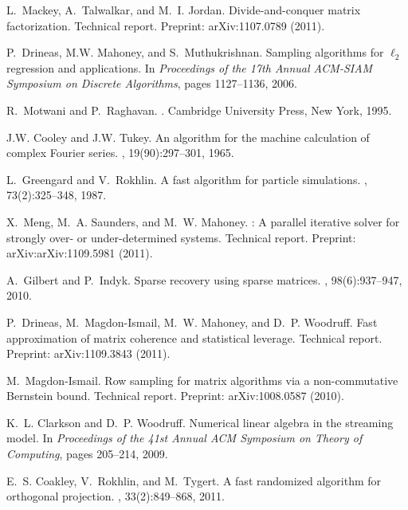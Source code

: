 \documentclass[twoside]{article}
\begin{document}
\begin{small}
\begin{thebibliography}{100}
L.~Mackey, A.~Talwalkar, and M.~I. Jordan.
\newblock Divide-and-conquer matrix factorization.
\newblock Technical report.
\newblock Preprint: arXiv:1107.0789 (2011).

P.~Drineas, M.W. Mahoney, and S.~Muthukrishnan.
\newblock Sampling algorithms for $\ell_2$ regression and applications.
\newblock In {\em Proceedings of the 17th Annual ACM-SIAM Symposium on Discrete
  Algorithms}, pages 1127--1136, 2006.

R.~Motwani and P.~Raghavan.
.
\newblock Cambridge University Press, New York, 1995.

J.W. Cooley and J.W. Tukey.
\newblock An algorithm for the machine calculation of complex {F}ourier series.
, 19(90):297--301, 1965.

L.~Greengard and V.~Rokhlin.
\newblock A fast algorithm for particle simulations.
, 73(2):325--348, 1987.

X.~Meng, M.~A. Saunders, and M.~W. Mahoney.
: A parallel iterative solver for strongly over- or
  under-determined systems.
\newblock Technical report.
\newblock Preprint: arXiv:arXiv:1109.5981 (2011).

A.~Gilbert and P.~Indyk.
\newblock Sparse recovery using sparse matrices.
, 98(6):937--947, 2010.

P.~Drineas, M.~Magdon-Ismail, M.~W. Mahoney, and D.~P. Woodruff.
\newblock Fast approximation of matrix coherence and statistical leverage.
\newblock Technical report.
\newblock Preprint: arXiv:1109.3843 (2011).

M.~Magdon-Ismail.
\newblock Row sampling for matrix algorithms via a non-commutative {B}ernstein
  bound.
\newblock Technical report.
\newblock Preprint: arXiv:1008.0587 (2010).

K.~L. Clarkson and D.~P. Woodruff.
\newblock Numerical linear algebra in the streaming model.
\newblock In {\em Proceedings of the 41st Annual ACM Symposium on Theory of
  Computing}, pages 205--214, 2009.

E.~S. Coakley, V.~Rokhlin, and M.~Tygert.
\newblock A fast randomized algorithm for orthogonal projection.
, 33(2):849--868, 2011.


\end{thebibliography}
\end{small}
\end{document}
